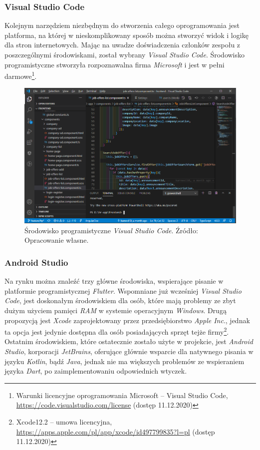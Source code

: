 \documentclass[twoside]{projektInzynierskiMS}
\numberwithin{figure}{section}
\begin{document}
\subsubsection{Visual Studio Code}
Kolejnym narzędziem niezbędnym do stworzenia całego oprogramowania jest platforma, na której w nieskomplikowany sposób można stworzyć widok i logikę dla stron internetowych. Mając na uwadze doświadczenia członków zespołu z poszczególnymi środowiskami, został wybrany \textit{Visual Studio Code}. Środowisko programistyczne stworzyła rozpoznawalna firma \textit{Microsoft} i jest w pełni darmowe\footnote{Warunki licencyjne oprogramowania Microsoft -- Visual Studio Code, \newline 
\url{https://code.visualstudio.com/license} (dostęp 11.12.2020)}.

\begin{figure}[h!]
  \centering
  \includegraphics[scale=0.55]{images/visualcode.png}
    \caption{Środowisko programistyczne \textit{Visual Studio Code}. Źródło: Opracowanie własne.}
    \label{fig:visualcode}
\end{figure}

\subsubsection{Android Studio}
Na rynku można znaleźć trzy główne środowiska, wspierające pisanie w platformie programistycznej \textit{Flutter}. Wspomniane już wcześniej \textit{Visual Studio Code}, jest doskonałym środowiskiem dla osób, które mają problemy ze zbyt dużym użyciem pamięci \textit{RAM} w systemie operacyjnym \textit{Windows}. Drugą propozycją jest \textit{Xcode} zaprojektowany przez przedsiębiorstwo \textit{Apple Inc}., jednak ta opcja jest jedynie dostępna dla osób posiadających sprzęt tejże firmy\footnote{Xcode12.2 – umowa licencyjna, \newline
\url{https://apps.apple.com/pl/app/xcode/id497799835?l=pl} (dostęp 11.12.2020)}. Ostatnim środowiskiem, które ostatecznie zostało użyte w projekcie, jest \textit{Android Studio}, korporacji \textit{JetBrains}, oferujące głównie wsparcie dla natywnego pisania w języku \textit{Kotlin}, bądź \textit{Java}, jednak nie ma większych problemów ze wspieraniem języka \textit{Dart}, po zaimplementowaniu odpowiednich wtyczek.
\end{document}

